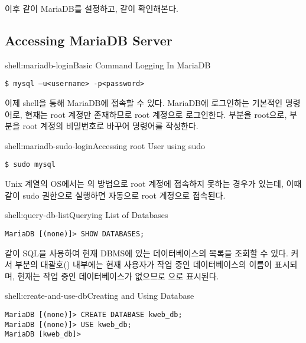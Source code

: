 이후 \와 같이 MariaDB를 설정하고, \와 같이 확인해본다.

\subsection*{Accessing MariaDB Server}

\begin{shellenv}{shell:mariadb-login}{Basic Command Logging In MariaDB}\begin{verbatim}
$ mysql –u<username> -p<password>
\end{verbatim}
\end{shellenv}

이제 shell을 통해 MariaDB에 접속할 수 있다. \은 MariaDB에 로그인하는 기본적인 명령어로, 현재는 root 계정만 존재하므로 root 계정으로 로그인한다.  부분을 root으로,  부분을 root 계정의 비밀번호로 바꾸어 명령어를 작성한다.

\begin{shellenv}{shell:mariadb-sudo-login}{Accessing root User using sudo}\begin{verbatim}
$ sudo mysql
\end{verbatim}
\end{shellenv}

Unix 계열의 OS에서는 의 방법으로 root 계정에 접속하지 못하는 경우가 있는데, 이때 \과 같이 sudo 권한으로 실행하면 자동으로 root 계정으로 접속된다.

\begin{shellenv}{shell:query-db-list}{Querying List of Databases}\begin{verbatim}
MariaDB [(none)]> SHOW DATABASES;
\end{verbatim}
\end{shellenv}

\와 같이 SQL을 사용하여 현재 DBMS에 있는 데이터베이스의 목록을 조회할 수 있다. 커서 부분의 대괄호(\cd{[]}) 내부에는 현재 사용자가 작업 중인 데이터베이스의 이름이 표시되며, 현재는 작업 중인 데이터베이스가 없으므로 으로 표시된다.

\begin{shellenv}{shell:create-and-use-db}{Creating and Using Database}\begin{verbatim}
MariaDB [(none)]> CREATE DATABASE kweb_db;
MariaDB [(none)]> USE kweb_db;
MariaDB [kweb_db]>
\end{verbatim}
\end{shellenv}

